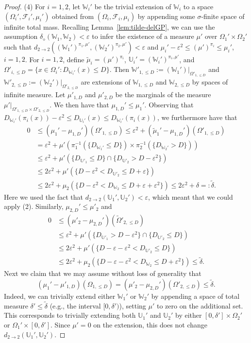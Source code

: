\documentclass{amsart}
\numberwithin{equation}{section}
\numberwithin{figure}{section}
\theoremstyle{definition}
\theoremstyle{remark}
\newcommand{\wOmega}{{\widetilde{\Omega}}}
\newcommand{\cW}{\mathbb{W}}
\newcommand{\cF}{\mathcal{F}}
\newcommand{\cU}{\mathbb{U}}
\def\d22{d_{2\to 2}}
\def\delGP{\delta_\diamond}
\begin{document}
\begin{proof}
(4) For $i=1,2$, let $\cW_i'$ be the trivial extension of $\cW_i$ to a space
$(\Omega_i',\cF_i',\mu_i')$ obtained from $(\Omega_i,\cF_i,\mu_i)$ by
appending some $\sigma$-finite space of infinite total mass. Recalling
Lemma~\ref{lem:tilde-delGP}, we can use the assumption
$\delGP(\cW_1,\cW_2)<\varepsilon$ to infer the existence of a measure $\mu'$
over $\Omega_1'\times\Omega_2'$ such that
$\d22((\cW_1')^{\pi_1,\mu'},(\cW_2')^{\pi_2,\mu'})<\varepsilon$ and
$\mu_i'-\varepsilon^2\leq(\mu')^{\pi_i}\leq\mu_i'$, $i=1,2$. For $i=1,2$,
define $\widetilde\mu_i=(\mu')^{\pi_i}$, $\cU_i'= (\cW_i')^{\pi_{i},\mu'}$,
and $\Omega'_{i,\leq D}=\{x\in\Omega_i': D_{\cW_i'}(x)\leq D\}$. Then
$\cW'_{{1,\leq D}}:=(\cW_1')|_{\Omega'_{1,\leq D}}$ and $\cW'_{{2,\leq
D}}:=(\cW_2')|_{\Omega'_{2,\leq D}}$ are extensions of $\cW_{1,\leq D}$ and
$\cW_{2,\leq D}$ by spaces of infinite measure. Let $\mu'_{1,D}$ and
$\mu'_{2,D}$ be the marginals of the measure $\mu'|_{\Omega'_{1,\le D} \times
\Omega'_{2,\le D}}$. We then have that $\mu_{1,D}' \le \mu_1'$. Observing
that $ D_{\cW_i'}(\pi_i(x))-\varepsilon^2\leq D_{\cU_i'}(x)\leq
D_{\cW_i'}(\pi_i(x))$, we furthermore have that
\begin{align*}
0 &\le (\mu_1'-\mu_{1,D}')(\Omega'_{1,\le D})
\leq\varepsilon^2+(\widetilde\mu_1'-\mu_{1,D}')(\Omega'_{1,\le D})
\\
&=\varepsilon^2+\mu'(\pi_1^{-1}(\{D_{\cW_1'}\leq D\})\times\pi_2^{-1}(\{D_{\cW_2'}>D\}))
\\
&\leq\varepsilon^2+\mu'(\{ D_{\cU'_1}\le D  \}\cap\{D_{\cU'_2}>D-\varepsilon^2\})
\\
&\le 2\varepsilon^2 + \mu'(\{ D-\varepsilon^2<D_{\cU'_2}\leq D+\varepsilon \})
\\
&\leq 2\varepsilon^2 + \mu_2(\{ D-\varepsilon^2<D_{\cW_2} \le D+\varepsilon+\varepsilon^2\})
\leq 2\varepsilon^2+\delta=:\widetilde\delta.
\end{align*}
Here we used the fact that $\d22(\cU_1',\cU_2')<\varepsilon$, which meant
that we could apply (2). Similarly, $\mu_{2,D}' \le \mu'_2$ and
\begin{align*}
0 &\le (\mu'_2-\mu_{2,D}')(\wOmega'_{2,\le D})\\
&\leq\varepsilon^2+\mu'(\{ D_{\cU'_1}>D-\varepsilon^2  \}\cap\{D_{\cU'_2}\le D\})
\\
&\le 2\varepsilon^2 + \mu'(\{ D-\varepsilon-\varepsilon^2<D_{\cU'_2}\leq D \})\\
&\leq 2\varepsilon^2 + \mu_2(\{ D-\varepsilon-\varepsilon^2<D_{\cW_2} \le D+\varepsilon^2\})
\leq \widetilde\delta.
\end{align*}
Next we claim that we may assume without loss of generality that
\[
(\mu_1' - \mu'_{1,D})(\Omega_{1,\leq D}) =
(\mu'_2-\mu_{2,D}')(\Omega'_{2,\leq D})\leq \widetilde\delta.
\]
Indeed, we can trivially extend either $ \cW_1'$ or $\cW_2'$ by appending a
space of total measure $\delta'\leq \widetilde\delta$ (e.g., the interval
$[0,\delta')$), setting $\mu'$ to zero on the additional set. This
corresponds to trivially extending both ${\cU_{1}'}$ and ${\cU_{2}'}$ by
either $[0,\delta']\times\Omega_2'$ or $\Omega_1'\times [0,\delta']$. Since
$\mu'=0$ on the extension, this does not change $\d22({\cU_{1}'},{\cU_{2}'})
$.


\end{proof}
\end{document}
